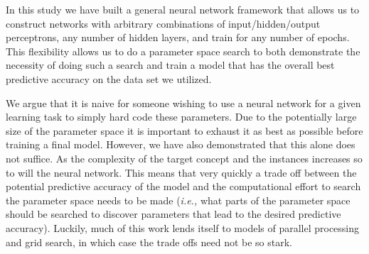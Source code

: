 In this study we have built a general neural network framework that allows us to construct networks with arbitrary combinations of input/hidden/output perceptrons, any number of hidden layers, and train for any number of epochs.
This flexibility allows us to do a parameter space search to both demonstrate the necessity of doing such a search and train a model that has the overall best predictive accuracy on the data set we utilized.

We argue that it is naive for someone wishing to use a neural network for a given learning task to simply hard code these parameters.
Due to the potentially large size of the parameter space it is important to exhaust it as best as possible before training a final model.
However, we have also demonstrated that this alone does not suffice.
As the complexity of the target concept and the instances increases so to will the neural network.
This means that very quickly a trade off between the potential predictive accuracy of the model and the computational effort to search the parameter space needs to be made ({\em i.e.,} what parts of the parameter space should be searched to discover parameters that lead to the desired predictive accuracy).
Luckily, much of this work lends itself to models of parallel processing and grid search, in which case the trade offs need not be so stark.

